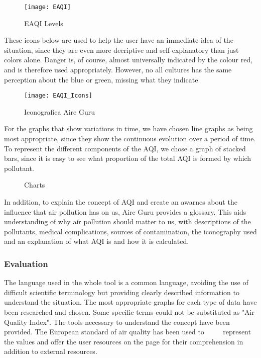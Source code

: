 \begin{figure}[ht]
    \centering
    \texttt{[image: EAQI]}
    \caption{EAQI Levels}
\end{figure}

These icons below are used to help the user have an immediate idea of the situation, since they are even more
decriptive and self-explanatory than just colors alone. Danger is, of course, almost universally indicated by 
the colour red, and is therefore used appropriately. However, no all cultures has the same perception about
the blue or green, missing what they indicate\\

\begin{figure}[ht]
    \centering
    \texttt{[image: EAQI\_Icons]}
    \caption{Iconografica Aire Guru}
\end{figure}

For the graphs that show variations in time,  we have chosen line graphs as being most appropriate,
since they show the continuous evolution over a period of time. To represent the different components of the AQI, we chose a
graph of stacked bars, since it is easy to see what proportion of the total AQI is formed by which pollutant. \\

\begin{figure}[ht]
    \centering
        \hfill
    \caption{Charts}
\end{figure}

In addition, to explain the concept of AQI and create an awarnes about the influence that air pollution has on us, Aire Guru provides a
glossary. This aids understanding of why air pollution should matter to us, with descriptions of the pollutants, medical complications, sources of contamination, the iconography used and
an explanation of what AQI is and how it is calculated. \\

\subsubsection*{Evaluation}  

\begin{itemize}
    \done The language used in the whole tool is a common language, avoiding the use of difficult scientific terminology but providing clearly described information to understand the situation.
    \done The most appropriate graphs for each type of data have been researched and chosen.
    \crossed Some specific terms could not be substituted as "Air Quality Index".
    \done The tools necessary to understand the concept have been provided. The European standard of air quality has been used to
         represent the values and offer the user resources on the page for their comprehension in addition to external resources.
\end{itemize}